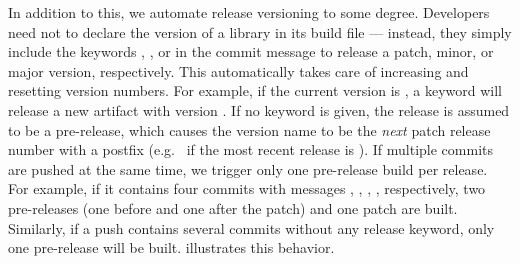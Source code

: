 In addition to this, we automate release versioning to some degree. Developers need not to declare the version of a library in its build file --- instead, they simply include the keywords , , or  in the commit message to release a patch, minor, or major version, respectively. This automatically takes care of increasing and resetting version numbers. For example, if the current version is , a  keyword will release a new artifact with version . If no keyword is given, the release is assumed to be a pre-release, which causes the version name to be the \emph{next} patch release number with a  postfix (e.g.\  if the most recent release is ). If multiple commits are pushed at the same time, we trigger only one pre-release build per release. For example, if it contains four commits with messages , , , , respectively, two pre-releases (one before and one after the patch) and one patch are built. Similarly, if a push contains several commits without any release keyword, only one pre-release will be built.  illustrates this behavior.
